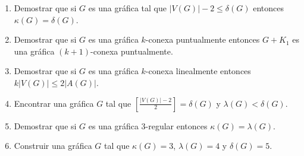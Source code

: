 \documentclass[12pt]{report}
\newcommand{\R}{\mathbb R}
\newcommand{\Z}{\mathbb Z}
\newcommand{\N}{\mathbb N}
\begin{document}
\begin{enumerate}
%
\item Demostrar que si $G$ es una gráfica tal que $|V(G)|-2 \leq \delta(G)$ entonces $\kappa(G) = \delta(G)$.
%

\item Demostrar que si $G$ es una gráfica $k$-conexa puntualmente entonces $G+K_1$ es una gráfica $(k+1)$-conexa puntualmente.


\item Demostrar que si $G$ es una gráfica $k$-conexa linealmente entonces $ k |V(G)| \leq 2 |A(G)|$.


\item Encontrar una gráfica $G$ tal que $\left[\frac{|V(G)|-2}{2}\right] = \delta(G)$ y $\lambda(G) < \delta(G)$.

\item Demostrar que si $G$ es una gráfica $3$-regular entonces $\kappa(G) = \lambda(G)$.


\item Construir una gráfica $G$ tal que $\kappa(G) =3$, $\lambda (G) = 4$ y $\delta(G) =5$.

\end{enumerate}
\end{document}
